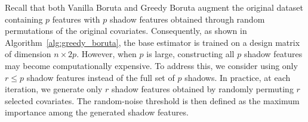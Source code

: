 \documentclass[runningheads]{llncs}
\begin{document}




Recall that both Vanilla Boruta and Greedy Boruta augment the original dataset containing \(p\) features with \(p\) shadow features obtained through random permutations of the original covariates. Consequently, as shown in Algorithm~\ref{alg:greedy_boruta}, the base estimator is trained on a design matrix of dimension \(n \times 2p\). However, when \(p\) is large, constructing all \(p\) shadow features may become computationally expensive. To address this, we consider using only \(r \leq p\) shadow features instead of the full set of \(p\) shadows. In practice, at each iteration, we generate only \(r\) shadow features obtained by randomly permuting \(r\) selected covariates. The random-noise threshold is then defined as the maximum importance among the generated shadow features.
\end{document}
